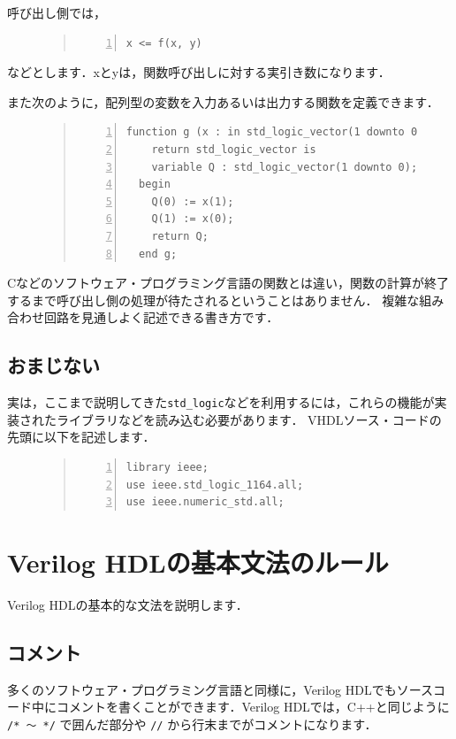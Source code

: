 \documentclass[a4paper,dvipdfmx]{jsarticle}
\begin{document}
呼び出し側では，
\begin{figure}[H]
\begin{quote}
\begin{Verbatim}[frame=single, numbers=left, baselinestretch=0.8]
x <= f(x, y)
\end{Verbatim}
\end{quote}
\end{figure}
などとします．xとyは，関数呼び出しに対する実引き数になります．

また次のように，配列型の変数を入力あるいは出力する関数を定義できます．
\begin{figure}[H]
\begin{quote}
\begin{Verbatim}[frame=single, numbers=left, baselinestretch=0.8]
   function g (x : in std_logic_vector(1 downto 0))
    return std_logic_vector is
    variable Q : std_logic_vector(1 downto 0);
  begin
    Q(0) := x(1);
    Q(1) := x(0);
    return Q;
  end g;
\end{Verbatim}
\end{quote}
\end{figure}
Cなどのソフトウェア・プログラミング言語の関数とは違い，関数の計算が終了するまで呼び出し側の処理が待たされるということはありません．
複雑な組み合わせ回路を見通しよく記述できる書き方です．

\subsection{おまじない}
実は，ここまで説明してきた\verb|std_logic|などを利用するには，これらの機能が実装されたライブラリなどを読み込む必要があります．
VHDLソース・コードの先頭に以下を記述します．
\begin{figure}[H]
\begin{quote}
\begin{Verbatim}[frame=single, numbers=left, baselinestretch=0.8]
library ieee;
use ieee.std_logic_1164.all;
use ieee.numeric_std.all;
\end{Verbatim}
\end{quote}
\end{figure}

\section{Verilog HDLの基本文法のルール}
Verilog HDLの基本的な文法を説明します．

\subsection{コメント}
多くのソフトウェア・プログラミング言語と同様に，Verilog HDLでもソースコード中にコメントを書くことができます．Verilog HDLでは，C++と同じように \verb|/* 〜 */| で囲んだ部分や \verb|//| から行末までがコメントになります．
\end{document}
